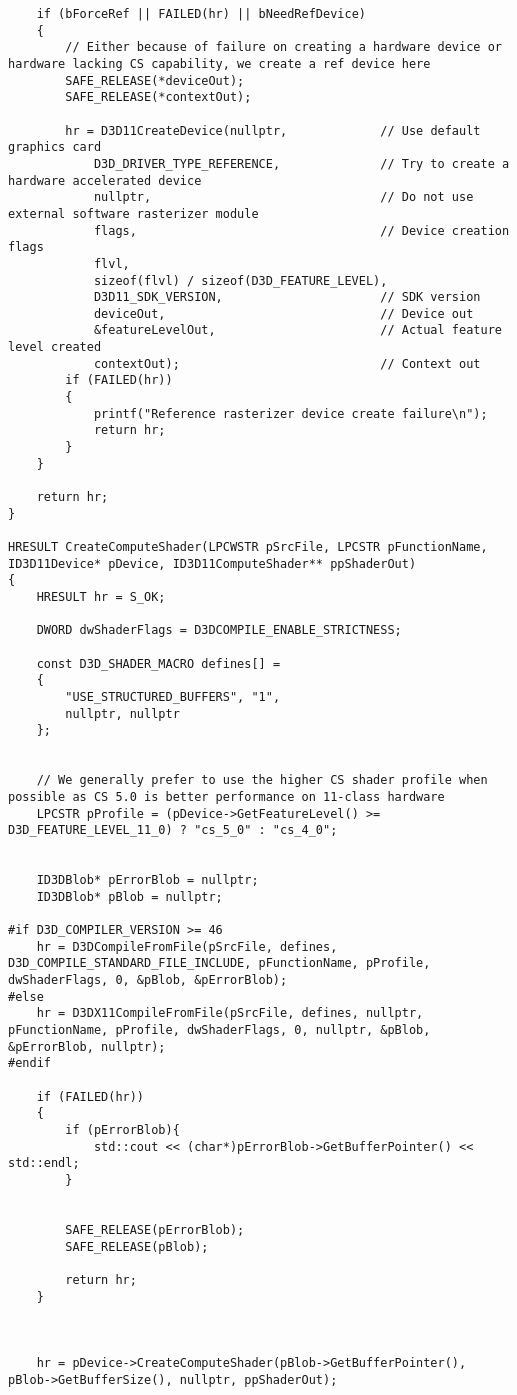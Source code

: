 \begin{lstlisting}
	if (bForceRef || FAILED(hr) || bNeedRefDevice)
	{
		// Either because of failure on creating a hardware device or hardware lacking CS capability, we create a ref device here
		SAFE_RELEASE(*deviceOut);
		SAFE_RELEASE(*contextOut);

		hr = D3D11CreateDevice(nullptr,				// Use default graphics card
			D3D_DRIVER_TYPE_REFERENCE,				// Try to create a hardware accelerated device
			nullptr,								// Do not use external software rasterizer module
			flags,									// Device creation flags
			flvl,
			sizeof(flvl) / sizeof(D3D_FEATURE_LEVEL),
			D3D11_SDK_VERSION,						// SDK version
			deviceOut,								// Device out
			&featureLevelOut,						// Actual feature level created
			contextOut);							// Context out
		if (FAILED(hr))
		{
			printf("Reference rasterizer device create failure\n");
			return hr;
		}
	}

	return hr;
}

HRESULT CreateComputeShader(LPCWSTR pSrcFile, LPCSTR pFunctionName, ID3D11Device* pDevice, ID3D11ComputeShader** ppShaderOut)
{
	HRESULT hr = S_OK;

	DWORD dwShaderFlags = D3DCOMPILE_ENABLE_STRICTNESS;

	const D3D_SHADER_MACRO defines[] =
	{
		"USE_STRUCTURED_BUFFERS", "1",
		nullptr, nullptr
	};


	// We generally prefer to use the higher CS shader profile when possible as CS 5.0 is better performance on 11-class hardware
	LPCSTR pProfile = (pDevice->GetFeatureLevel() >= D3D_FEATURE_LEVEL_11_0) ? "cs_5_0" : "cs_4_0";


	ID3DBlob* pErrorBlob = nullptr;
	ID3DBlob* pBlob = nullptr;

#if D3D_COMPILER_VERSION >= 46
	hr = D3DCompileFromFile(pSrcFile, defines, D3D_COMPILE_STANDARD_FILE_INCLUDE, pFunctionName, pProfile, dwShaderFlags, 0, &pBlob, &pErrorBlob);
#else
	hr = D3DX11CompileFromFile(pSrcFile, defines, nullptr, pFunctionName, pProfile, dwShaderFlags, 0, nullptr, &pBlob, &pErrorBlob, nullptr);
#endif

	if (FAILED(hr))
	{
		if (pErrorBlob){
			std::cout << (char*)pErrorBlob->GetBufferPointer() << std::endl;
		}


		SAFE_RELEASE(pErrorBlob);
		SAFE_RELEASE(pBlob);

		return hr;
	}



	hr = pDevice->CreateComputeShader(pBlob->GetBufferPointer(), pBlob->GetBufferSize(), nullptr, ppShaderOut);


\end{lstlisting}
